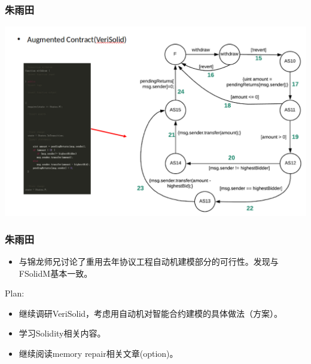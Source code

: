 \documentclass[aspectratio=1610, 13pt]{beamer}
\begin{document}
\begin{frame}\frametitle{朱雨田}
\begin{center}
\includegraphics[scale=0.3]{zyt2.png}
\end{center}
\end{frame}

\begin{frame}\frametitle{朱雨田}
\begin{itemize}
\item 与锦龙师兄讨论了重用去年协议工程自动机建模部分的可行性。发现与FSolidM基本一致。
\end{itemize}
Plan:
\begin{itemize}
\item 继续调研VeriSolid，考虑用自动机对智能合约建模的具体做法（方案）。
\item 学习Solidity相关内容。
\item 继续阅读memory repair相关文章(option)。
\end{itemize}
\end{frame}
\end{document}
